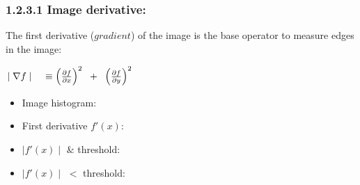 \subsubsection*{1.2.3.1 Image derivative:}
The first derivative ($gradient$) of the image is the base operator to measure edges in the image:
\begin{center}
$\mid \nabla f \mid \hspace{0.5cm} \equiv \Big( \frac{\partial f}{\partial x} \Big) ^2 \hspace{0.2cm} + \hspace{0.2cm} \Big(\frac{\partial f}{ \partial y}\Big)^2$
\end{center}
\begin{itemize}
\item 
\begin{minipage}[t]{\linewidth}
\raggedright Image histogram: \hspace{3cm}
\end{minipage}
\item 
\begin{minipage}[t]{\linewidth}
\raggedright First derivative $f'(x)$: \hspace{3cm}
\end{minipage}
\item 
\begin{minipage}[t]{\linewidth}
\raggedright $\mid f'(x) \mid $  $\&$ threshold: \hspace{3cm}
\end{minipage}
\item 
\begin{minipage}[t]{\linewidth}
\raggedright $\mid f'(x) \mid $ $<$ threshold: \hspace{3cm}
\end{minipage}
\end{itemize}
\pagebreak
